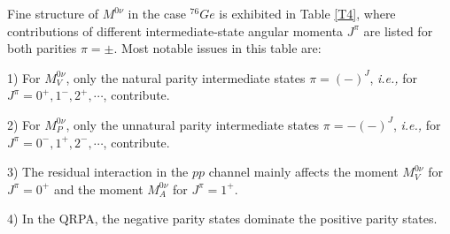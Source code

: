 \documentclass[nofootinbib,twocolumn,eqsecnum,floats,aps]{revtex4}
\def\ie{{\it i.e., }}
\def\b {{\beta}}
\begin{document}
{Fine structure of $M^{0\nu}$ in the case $^{76}Ge$ is exhibited in Table \ref{T4},
where contributions of different intermediate-state angular
momenta $J^\pi$  are listed for both parities $\pi=\pm$.
Most notable issues in this table are:

1) For  $M^{0\nu}_V$, only  the natural parity intermediate states $\pi=(-)^J$,
\ie for $J^\pi=0^+,1^-, 2^+,\cdots$, contribute.

2) For  $M^{0\nu}_P$, only the unnatural parity intermediate states $\pi=-(-)^J$,
\ie for $J^\pi=0^-,1^+, 2^-,\cdots$,  contribute.

3) The residual interaction in the $pp$ channel mainly affects the
moment $M^{0\nu}_V$ for $J^\pi=0^+$ and the moment $M^{0\nu}_A$ for $J^\pi=1^+$.

4) In the QRPA, the negative parity states dominate
the positive parity states.

}
\end{document}

